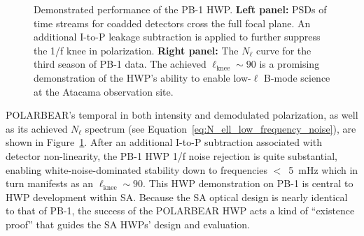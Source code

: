 \begin{figure}
    \centering
    \caption{Demonstrated performance of the PB-1 HWP. \textbf{Left panel:} PSDs of time streams for coadded detectors cross the full focal plane. An additional I-to-P leakage subtraction is applied to further suppress the 1/f knee in polarization. \textbf{Right panel:} The $N_{\ell}$ curve for the third season of PB-1 data. The achieved $\ell_{\mathrm{knee}} \sim 90$ is a promising demonstration of the HWP's ability to enable low-$\ell$ B-mode science at the Atacama observation site.}
    \label{fig:pb1_hwp_performance}
\end{figure}

POLARBEAR's temporal in both intensity and demodulated polarization, as well as its achieved $N_{\ell}$ spectrum (see Equation~\ref{eq:N_ell_low_frequency_noise}), are shown in Figure~\ref{fig:pb1_hwp_performance}. After an additional I-to-P subtraction associated with detector non-linearity, the PB-1 HWP 1/f noise rejection is quite substantial, enabling white-noise-dominated stability down to frequencies $<$~5~mHz which in turn manifests as an $\ell_{\mathrm{knee}} \sim 90$. This HWP demonstration on PB-1 is central to HWP development within SA. Because the SA optical design is nearly identical to that of PB-1, the success of the POLARBEAR HWP acts a kind of ``existence proof'' that guides the SA HWPs' design and evaluation.



